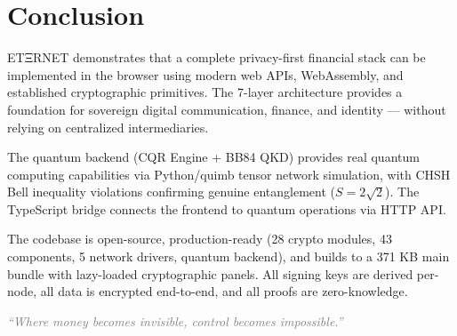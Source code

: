 \documentclass[11pt,a4paper]{article}
\begin{document}
\section{Conclusion}

ETΞRNET demonstrates that a complete privacy-first financial stack can be implemented in the browser using modern web APIs, WebAssembly, and established cryptographic primitives. The 7-layer architecture provides a foundation for sovereign digital communication, finance, and identity --- without relying on centralized intermediaries.

The quantum backend (CQR Engine + BB84 QKD) provides real quantum computing capabilities via Python/quimb tensor network simulation, with CHSH Bell inequality violations confirming genuine entanglement ($S = 2\sqrt{2}$). The TypeScript bridge connects the frontend to quantum operations via HTTP API.

The codebase is open-source, production-ready (28 crypto modules, 43 components, 5 network drivers, quantum backend), and builds to a 371 KB main bundle with lazy-loaded cryptographic panels. All signing keys are derived per-node, all data is encrypted end-to-end, and all proofs are zero-knowledge.

\vspace{1cm}
\begin{center}
\textcolor{gray}{\textit{``Where money becomes invisible, control becomes impossible.''}}
\end{center}
\end{document}
